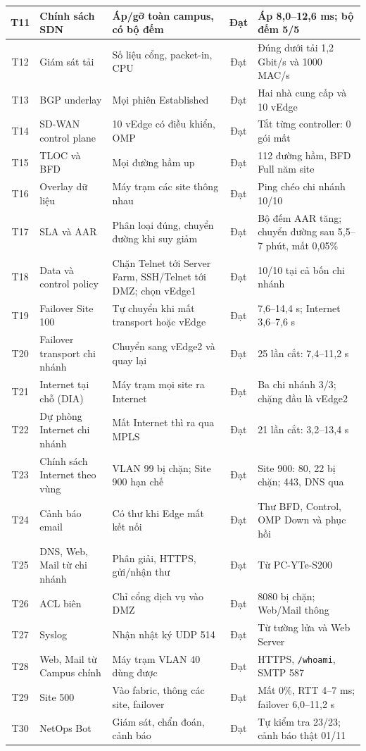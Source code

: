 \begin{longtable}{|c|L{3.3cm}|L{3.6cm}|c|L{\dimexpr\textwidth-0.9cm-3.3cm-3.6cm-1.1cm-10\arrayrulewidth\relax}|}
    \hline
    T11 & Chính sách SDN & Áp/gỡ toàn campus, có bộ đếm & Đạt & Áp 8,0--12,6 ms; bộ đếm 5/5 \\
    \hline
    T12 & Giám sát tải & Số liệu cổng, packet-in, CPU & Đạt & Đúng dưới tải 1,2 Gbit/s và 1000 MAC/s \\
    \hline
    T13 & BGP underlay & Mọi phiên Established & Đạt & Hai nhà cung cấp và 10 vEdge \\
    \hline
    T14 & SD-WAN control plane & 10 vEdge có điều khiển, OMP & Đạt & Tắt từng controller: 0 gói mất \\
    \hline
    T15 & TLOC và BFD & Mọi đường hầm up & Đạt & 112 đường hầm, BFD Full năm site \\
    \hline
    T16 & Overlay dữ liệu & Máy trạm các site thông nhau & Đạt & Ping chéo chi nhánh 10/10 \\
    \hline
    T17 & SLA và AAR & Phân loại đúng, chuyển đường khi suy giảm & Đạt & Bộ đếm AAR tăng; chuyển đường sau 5,5--7 phút, mất 0,05\% \\
    \hline
    T18 & Data và control policy & Chặn Telnet tới Server Farm, SSH/Telnet tới DMZ; chọn vEdge1 & Đạt & 10/10 tại cả bốn chi nhánh \\
    \hline
    T19 & Failover Site 100 & Tự chuyển khi mất transport hoặc vEdge & Đạt & 7,6--14,4 s; Internet 3,6--7,6 s \\
    \hline
    T20 & Failover transport chi nhánh & Chuyển sang vEdge2 và quay lại & Đạt & 25 lần cắt: 7,4--11,2 s \\
    \hline
    T21 & Internet tại chỗ (DIA) & Máy trạm mọi site ra Internet & Đạt & Ba chi nhánh 3/3; chặng đầu là vEdge2 \\
    \hline
    T22 & Dự phòng Internet chi nhánh & Mất Internet thì ra qua MPLS & Đạt & 21 lần cắt: 3,2--13,4 s \\
    \hline
    T23 & Chính sách Internet theo vùng & VLAN 99 bị chặn; Site 900 hạn chế & Đạt & Site 900: 80, 22 bị chặn; 443, DNS qua \\
    \hline
    T24 & Cảnh báo email & Có thư khi Edge mất kết nối & Đạt & Thư BFD, Control, OMP Down và phục hồi \\
    \hline
    T25 & DNS, Web, Mail từ chi nhánh & Phân giải, HTTPS, gửi/nhận thư & Đạt & Từ PC-YTe-S200 \\
    \hline
    T26 & ACL biên & Chỉ cổng dịch vụ vào DMZ & Đạt & 8080 bị chặn; Web/Mail thông \\
    \hline
    T27 & Syslog & Nhận nhật ký UDP 514 & Đạt & Từ tường lửa và Web Server \\
    \hline
    T28 & Web, Mail từ Campus chính & Máy trạm VLAN 40 dùng được & Đạt & HTTPS, \texttt{/whoami}, SMTP 587 \\
    \hline
    T29 & Site 500 & Vào fabric, thông các site, failover & Đạt & Mất 0\%, RTT 4--7 ms; failover 6,0--11,2 s \\
    \hline
    T30 & NetOps Bot & Giám sát, chẩn đoán, cảnh báo & Đạt & Tự kiểm tra 23/23; cảnh báo thật 01/11 \\
\end{longtable}
\endgroup

